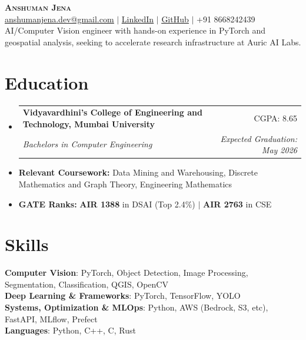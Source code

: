 \documentclass[letterpaper,10pt]{article}
\makeatletter
\newcommand{\resumeSubheading}[4]{
  \vspace{-2pt}\item
    \begin{tabular*}{\textwidth}[t]{@{}p{0.75\textwidth}@{\extracolsep{\fill}}r@{}}
      \textbf{#1} & \small #2 \\
      \textit{\small#3} & \textit{\small #4} \\
    \end{tabular*}\vspace{-4pt}
}
\newcommand{\resumeSubHeadingListStart}{\begin{itemize}[leftmargin=0in, label={}, topsep=0pt, partopsep=0pt]}
\newcommand{\resumeSubHeadingListEnd}{\end{itemize}}
\makeatother
\begin{document}
\fontsize{10.5}{11}\selectfont
\begin{center}
    {\Huge \scshape \textbf{Anshuman Jena}} \\ \vspace{4pt}
    \href{mailto:anshumanjena.dev@gmail.com}{\ul{anshumanjena.dev@gmail.com}} $|$
    \href{https://www.linkedin.com/in/anshumanjena/}{\ul{LinkedIn}} $|$
    \href{https://github.com/abandonedmonk}{\ul{GitHub}} $|$
    +91 8668242439 \\ \vspace{6pt}
    {AI/Computer Vision engineer with hands-on experience in PyTorch and geospatial analysis, seeking to accelerate research infrastructure at Auric AI Labs.}
\end{center}
\section{Education}
\resumeSubHeadingListStart
  \resumeSubheading
    {Vidyavardhini's College of Engineering and Technology, Mumbai \mbox{University}}{CGPA: 8.65}
    {Bachelors in Computer Engineering}{\textit{Expected Graduation: May 2026}}  \vspace{-9pt}
  \item \small{\textbf{Relevant Coursework:} Data Mining and Warehousing, Discrete Mathematics and Graph Theory, Engineering Mathematics} \vspace{-6pt}
  \item \small{\textbf{GATE Ranks:} \textbf{AIR 1388} in DSAI (Top 2.4\%) $|$ \textbf{AIR 2763} in CSE}
\resumeSubHeadingListEnd
\section{Skills}
\begin{itemize}[leftmargin=0in, label={}, topsep=0pt, partopsep=0pt]
  \small{\item{
    \textbf{Computer Vision}: PyTorch, Object Detection, Image Processing, Segmentation, Classification, QGIS, OpenCV \\
    \textbf{Deep Learning \& Frameworks}: PyTorch, TensorFlow, YOLO \\
    \textbf{Systems, Optimization \& MLOps}: Python, AWS (Bedrock, S3, etc), FastAPI, MLflow, Prefect \\
    \textbf{Languages}: Python, C++, C, Rust
  }}
\end{itemize}
\end{document}
